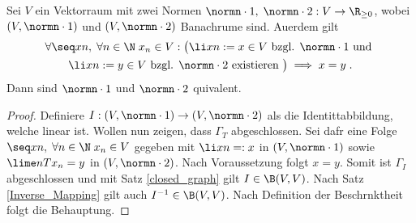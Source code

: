 \begin{theorem}
	Sei $V$ ein Vektorraum mit zwei Normen \(\normn\cdot 1, \;\normn\cdot 2: V \to \R_{\geq 0}\), wobei \((V,\normn\cdot 1)\) und \((V,\normn\cdot 2)\) Banachr\as ume sind. Au\s erdem gilt 
	\begin{multline*}
	\forall \seq xn,\; \forall n \in \N\; x_n \in V:\big( \li xn := x\in V \text{ bzgl. }\normn\cdot 1 \text{ und } \\\li xn := y\in V \text{ bzgl. }\normn\cdot 2 \text{ existieren }\big)  \implies x = y\;.
	\end{multline*}
	Dann sind \(\normn\cdot 1\) und \(\normn\cdot 2\) \as quivalent.
\end{theorem}

\begin{proof}
	Definiere \(I: (V,\normn\cdot1) \to (V,\normn\cdot 2)\) als die Identit\as tabbildung, welche linear ist. Wollen nun zeigen, dass \(\Gamma_T\) abgeschlossen. Sei daf\us r eine Folge \(\seq xn, \;\forall n \in \N\; x_n \in V\) gegeben mit \(\li xn =: x\) in \((V,\normn\cdot 1)\) sowie \(\lime n Tx_n = y\) in \((V,\normn\cdot 2)\). Nach Voraussetzung folgt \(x = y\). Somit ist \(\Gamma_I\) abgeschlossen und mit Satz \ref{closed_graph} gilt \(I \in \B(V,V)\). Nach Satz \ref{Inverse_Mapping} gilt auch \(I^{-1} \in \B(V,V)\). Nach Definition der Beschr\as nktheit folgt die Behauptung.
\end{proof}